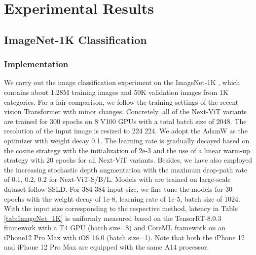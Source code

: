 \documentclass[10pt,twocolumn,letterpaper]{article}
\begin{document}
\section{Experimental Results}
\label{Experimental_section}

\subsection{ImageNet-1K Classification}
\subsubsection{Implementation} 
We carry out the image classification experiment on the ImageNet-1K \cite{ImageNet-1K}, which contains about 1.28M training images and 50K validation images from 1K categories.
For a fair comparison, we follow the training settings of the recent vision Transformer \cite{PVT_v1,Twins, sepvit, Scalablevit} with minor changes.
Concretely, all of the Next-ViT variants are trained for 300 epochs on 8 V100 GPUs with a total batch size of 2048. The resolution of the input image is resized to 224  224. 
We adopt the AdamW \cite{AdamW} as the optimizer with weight decay 0.1.
The learning rate is gradually decayed based on the cosine strategy with the initialization of 2e-3 and the use of a linear warm-up strategy with 20 epochs for all Next-ViT variants.
Besides, we have also employed the increasing stochastic depth augmentation \cite{Stochasticdepth} with the maximum drop-path rate of 0.1, 0.2, 0.2 for Next-ViT-S/B/L. Models with  are trained on large-scale dataset follow SSLD\cite{ssld}. For 384  384 input size, we fine-tune the models for 30 epochs with the weight decay of 1e-8, learning rate of 1e-5, batch size of 1024.
With the input size corresponding to the respective method, latency in Table \ref{tab:ImageNet_1K} is uniformly measured based on the TensorRT-8.0.3 framework with a T4 GPU (batch size=8) and CoreML framework on an iPhone12 Pro Max with iOS 16.0 (batch size=1). Note that both the iPhone 12 and iPhone 12 Pro Max are equipped with the same A14 processor.
\end{document}
